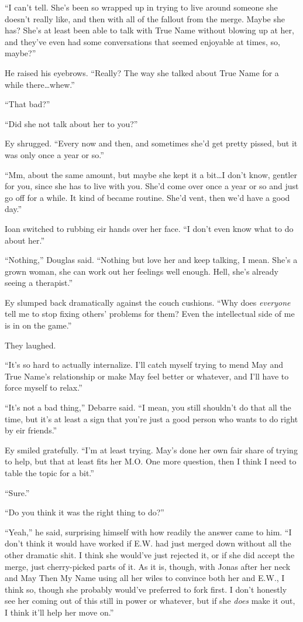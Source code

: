``I can't tell. She's been so wrapped up in trying to live around someone she doesn't really like, and then with all of the fallout from the merge. Maybe she has? She's at least been able to talk with True Name without blowing up at her, and they've even had some conversations that seemed enjoyable at times, so, maybe?''

He raised his eyebrows. ``Really? The way she talked about True Name for a while there\ldots whew.''

``That bad?''

``Did she not talk about her to you?''

Ey shrugged. ``Every now and then, and sometimes she'd get pretty pissed, but it was only once a year or so.''

``Mm, about the same amount, but maybe she kept it a bit\ldots I don't know, gentler for you, since she has to live with you. She'd come over once a year or so and just go off for a while. It kind of became routine. She'd vent, then we'd have a good day.''

Ioan switched to rubbing eir hands over her face. ``I don't even know what to do about her.''

``Nothing,'' Douglas said. ``Nothing but love her and keep talking, I mean. She's a grown woman, she can work out her feelings well enough. Hell, she's already seeing a therapist.''

Ey slumped back dramatically against the couch cushions. ``Why does \emph{everyone} tell me to stop fixing others' problems for them? Even the intellectual side of me is in on the game.''

They laughed.

``It's so hard to actually internalize. I'll catch myself trying to mend May and True Name's relationship or make May feel better or whatever, and I'll have to force myself to relax.''

``It's not a bad thing,'' Debarre said. ``I mean, you still shouldn't do that all the time, but it's at least a sign that you're just a good person who wants to do right by eir friends.''

Ey smiled gratefully. ``I'm at least trying. May's done her own fair share of trying to help, but that at least fits her M.O. One more question, then I think I need to table the topic for a bit.''

``Sure.''

``Do you think it was the right thing to do?''

``Yeah,'' he said, surprising himself with how readily the answer came to him. ``I don't think it would have worked if E.W. had just merged down without all the other dramatic shit. I think she would've just rejected it, or if she did accept the merge, just cherry-picked parts of it. As it is, though, with Jonas after her neck and May Then My Name using all her wiles to convince both her and E.W., I think so, though she probably would've preferred to fork first. I don't honestly see her coming out of this still in power or whatever, but if she \emph{does} make it out, I think it'll help her move on.''

